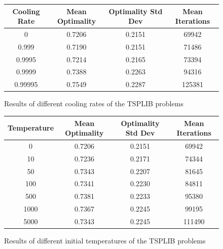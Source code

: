 \documentclass{article}
\begin{document}
\begin{figure}[h]
    \centering
    \begin{tabular}{ |c|c|c|c| } 
        \hline
        Cooling Rate & Mean Optimality & Optimality Std Dev & Mean Iterations \\ 
        \hline
        0       & 0.7206 & 0.2151 & 69942 \\
        \hline
        0.999   & 0.7190 & 0.2151 & 71486 \\
        \hline
        0.9995  & 0.7214 & 0.2165 & 73394 \\ 
        \hline
        0.9999  & 0.7388 & 0.2263 & 94316 \\
        \hline
        0.99995 & 0.7549 & 0.2287 & 125381 \\
        \hline
    \end{tabular}
    \caption{Results of different cooling rates of the TSPLIB problems}
\end{figure}

\begin{figure}[h]
    \centering
    \begin{tabular}{ |c|c|c|c| } 
        \hline
        Temperature & Mean Optimality & Optimality Std Dev & Mean Iterations \\ 
        \hline
        0    & 0.7206 & 0.2151 & 69942 \\
        \hline
        10   & 0.7236 & 0.2171 & 74344 \\
        \hline
        50   & 0.7343 & 0.2207 & 81645 \\
        \hline
        100  & 0.7341 & 0.2230 & 84811 \\ 
        \hline
        500  & 0.7381 & 0.2233 & 95380 \\
        \hline
        1000 & 0.7367 & 0.2245 & 99195 \\
        \hline
        5000 & 0.7343 & 0.2245 & 111490 \\
        \hline
    \end{tabular}
    \caption{Results of different initial temperatures of the TSPLIB problems}
\end{figure}
\end{document}
